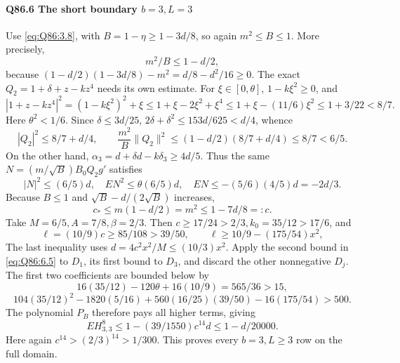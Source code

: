 \paragraph{Q86.6 The short boundary \(b=\allowbreak 3,\allowbreak L=\allowbreak 3\)}
Use \eqref{eq:Q86:3.8}, with
\(B=\allowbreak 1-\eta\ge\allowbreak 1-3d/8\), so again \(m^2\le\allowbreak  B\le\allowbreak 1\).
More precisely,
\[
m^2/B\le1-d/2,
\tag{Q86.6.1}\label{eq:Q86:6.1}
\]
because \((1-d/2)(1-3d/8)-m^2=\allowbreak d/8-d^2/16\ge\allowbreak 0\).
The exact \(Q_2=\allowbreak 1+\delta+z-kz^4\) needs its own estimate.
For \(\xi\in[0,\allowbreak \theta]\), \(1-k\xi^2\ge\allowbreak 0\), and
\[
|1+z-kz^4|^2=(1-k\xi^2)^2+\xi
\le1+\xi-2\xi^2+\xi^4
\le1+\xi-(11/6)\xi^2\le1+3/22<8/7.
\]
Here \(\theta^2<\allowbreak 1/6\).
Since \(\delta\le\allowbreak 3d/25\),
\(2\delta+\delta^2\le\allowbreak 153d/625<\allowbreak d/4\), whence
\[
|Q_2|^2\le8/7+d/4,\qquad
\frac{m^2}{B}\|Q_2\|^2
\le(1-d/2)(8/7+d/4)\le8/7<6/5.
\tag{Q86.6.2}\label{eq:Q86:6.2}
\]
On the other hand,
\(\alpha_3=\allowbreak d+\delta d-k\delta_3\ge\allowbreak 4d/5\).
Thus the same \(N=\allowbreak (m/\sqrt B)B_0Q_2g'\) satisfies
\[
|N|^2\le(6/5)d,\quad EN^2\le\theta(6/5)d,
\quad EN\le-(5/6)(4/5)d=-2d/3.
\tag{Q86.6.3}\label{eq:Q86:6.3}
\]
Because \(B\le\allowbreak 1\) and \(\sqrt B-d/(2\sqrt B)\) increases,
\[
c_*\le m(1-d/2)=m^2\le1-7d/8=:c.
\tag{Q86.6.4}\label{eq:Q86:6.4}
\]
Take \(M=\allowbreak 6/5,\allowbreak A=\allowbreak 7/8,\allowbreak \beta=\allowbreak 2/3\).
Then \(c\ge\allowbreak 17/24>\allowbreak 2/3,\allowbreak k_0=\allowbreak 35/12>\allowbreak 17/6\), and
\[
\ell=(10/9)c\ge85/108>39/50,\qquad
\ell\ge10/9-(175/54)x^2,
\tag{Q86.6.5}\label{eq:Q86:6.5}
\]
The last inequality uses \(d=\allowbreak 4c^2x^2/M\le\allowbreak (10/3)x^2\).
Apply the second bound in \eqref{eq:Q86:6.5} to \(D_1\), its first bound to \(D_3\), and discard the other nonnegative \(D_j\).
The first two coefficients are bounded below by
\[
16(35/12)-120\theta+16(10/9)=565/36>15,
\]
\[
104(35/12)^2-1820(5/16)
 +560(16/25)(39/50)-16(175/54)>500.
\]
The polynomial \(P_B\) therefore pays all higher terms, giving
\[
E H_{3,3}^8\le1-(39/1550)c^{14}d\le1-d/20000.
\tag{Q86.6.6}\label{eq:Q86:6.6}
\]
Here again \(c^{14}>\allowbreak (2/3)^{14}>\allowbreak 1/300\).
This proves every \(b=\allowbreak 3,\allowbreak L\ge\allowbreak 3\) row on the full domain.

